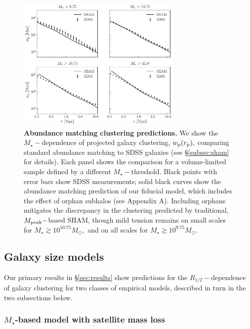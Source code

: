 \documentclass[usenatbib,usegraphicx,letterpaper]{mn2e}
\newcommand{\rhalf}{R_{1/2}}
\newcommand{\mstar}{M_{\star}}
\newcommand{\mpeak}{M_{\rm peak}}
\newcommand{\rproj}{r_{\rm p}}
\newcommand{\wproj}{w_{\rm p}}
\newcommand{\msun}{M_\odot}
\begin{document}
\begin{figure}
\centering
\includegraphics[width=8cm]{FIGS/baseline_sham.pdf}
\caption{
{\bf Abundance matching clustering predictions.}
We show the $\mstar-$dependence of projected galaxy clustering, $\wproj(\rproj),$ comparing standard abundance matching to SDSS galaxies (see \S\ref{subsec:sham} for details). Each panel shows the comparison for a volume-limited sample defined by a different $\mstar-$threshold. Black points with error bars show SDSS measurements; solid black curves show the abundance matching prediction of our fiducial model, which includes the effect of orphan subhalos (see Appendix A). Including orphans mitigates the discrepancy in the clustering predicted by traditional, $\mpeak-$based SHAM, though mild tension remains on small scales for $\mstar\gtrsim10^{10.75}\msun,$ and on all scales for $\mstar\gtrsim10^{9.75}\msun.$
}
\label{fig:baseline_sham_clustering}
\end{figure}

\subsection{Galaxy size models}
\label{subsec:model}

Our primary results in \S\ref{sec:results} show predictions for the $\rhalf-$dependence of galaxy clustering for two classes of empirical models, described in turn in the two subsections below.

\subsubsection{$\mstar$-based model with satellite mass loss}
\label{subsubsec:strippingmodel}
\end{document}
